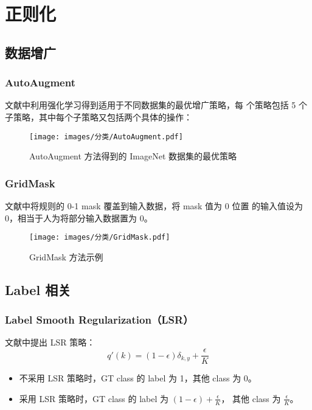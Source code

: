 \section{正则化}
\subsection{数据增广}
\subsubsection{AutoAugment}
文献中利用强化学习得到适用于不同数据集的最优增广策略，每
个策略包括 5 个子策略，其中每个子策略又包括两个具体的操作：

\begin{figure}[ht]
  \centering
  \texttt{[image: images/分类/AutoAugment.pdf]}
  \caption{AutoAugment 方法得到的 ImageNet 数据集的最优策略}
  \label{fig:autoaugment}
\end{figure}


\subsubsection{GridMask}
文献中将规则的 0-1 mask 覆盖到输入数据，将 mask 值为 0 位置
的输入值设为 0，相当于人为将部分输入数据置为 0。

\begin{figure}[ht]
  \centering
  \texttt{[image: images/分类/GridMask.pdf]}
  \caption{GridMask 方法示例}
  \label{fig:gridmask}
\end{figure}

\subsection{Label 相关}
\subsubsection{Label Smooth Regularization（LSR）}
文献中提出 LSR 策略：
\begin{equation}
  q'(k) = (1-\epsilon) \delta_{k,y} + \frac{\epsilon}{K}
\end{equation}

\begin{itemize}
  \item 不采用 LSR 策略时，GT class 的 label 为 1，其他 class 为 0。
  \item 采用 LSR 策略时，GT class 的 label 为 $(1-\epsilon) + \frac{\epsilon}{K}$，
    其他 class 为 $\frac{\epsilon}{K}$。
\end{itemize}

